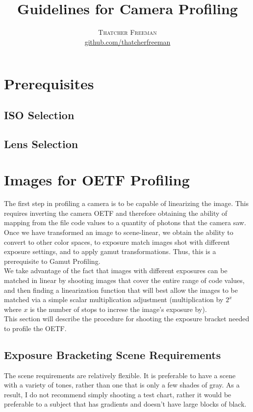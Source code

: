 \documentclass[twoside]{article}
\title{Guidelines for Camera Profiling} %
\author{%
    \textsc{Thatcher Freeman} \\[1ex] %
    \normalsize \href{https://github.com/thatcherfreeman}{github.com/thatcherfreeman}
}
\date{}%
\begin{document}
\maketitle


\section{Prerequisites}
\subsection*{ISO Selection}
\subsection*{Lens Selection}

\section{Images for OETF Profiling}
The first step in profiling a camera is to be capable of linearizing the image. This requires inverting the camera OETF and therefore obtaining the ability of mapping from the file code values to a quantity of photons that the camera saw. Once we have transformed an image to scene-linear, we obtain the ability to convert to other color spaces, to exposure match images shot with different exposure settings, and to apply gamut transformations. Thus, this is a prerequisite to Gamut Profiling. \\

We take advantage of the fact that images with different exposures can be matched in linear by shooting images that cover the entire range of code values, and then finding a linearization function that will best allow the images to be matched via a simple scalar multiplication adjustment (multiplication by $2^x$ where $x$ is the number of stops to increse the image's exposure by). \\

This section will describe the procedure for shooting the exposure bracket needed to profile the OETF.

\subsection*{Exposure Bracketing Scene Requirements}
The scene requirements are relatively flexible. It is preferable to have a scene with a variety of tones, rather than one that is only a few shades of gray. As a result, I do not recommend simply shooting a test chart, rather it would be preferable to a subject that has gradients and doesn't have large blocks of black.
\end{document}
